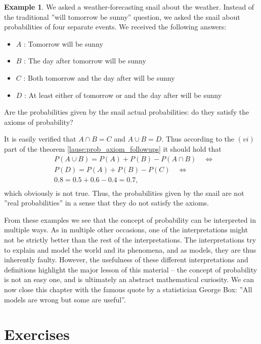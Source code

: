 \documentclass[12pt,a4paper,leqno]{report}
\theoremstyle{plain}
\theoremstyle{definition}
\newtheorem{esim}[equation]{Example}
\begin{document}
\begin{esim}
We asked a weather-forecasting snail about the weather. Instead of the traditional ''will tomorrow be sunny'' question, we asked the snail about probabilities of four separate events. We received the following answers:
\begin{itemize}
\item $A$ : Tomorrow will be sunny 
\item $B$ : The day after tomorrow will be sunny 
\item $C$ : Both tomorrow and the day after will be sunny 
\item $D$ : At least either of tomorrow or and the day after will be sunny 
\end{itemize}

Are the probabilities given by the snail actual probabilities: do they satisfy the axioms of probability?

It is easily verified that $A \cap B = C$ and $A \cup B = D$. Thus according to the $(vi)$ part of the theorem \ref{lause:prob_axiom_followups} it should hold that
\[
\begin{split}
&P(A \cup B) = P(A) + P(B) - P(A \cap B) \quad \Leftrightarrow \\
&P(D) = P(A) + P(B) - P(C) \quad \Leftrightarrow \\
&0.8 = 0.5 + 0.6 - 0.4 = 0.7, \\
\end{split}
\]
which obviously is not true. Thus, the probabilities given by the snail are not ''real probabilities'' in a sense that they do not satisfy the axioms.
\end{esim}

From these examples we see that the concept of probability can be interpreted in multiple ways. As in multiple other occasions, one of the interpretations might not be strictly better than the rest of the interpretations. The interpretations try to explain and model the world and its phenomena, and as models, they are thus inherently faulty. However, the usefulness of these different interpretations and definitions highlight the major lesson of this material -- the concept of probability is not an easy one, and is ultimately an abstract mathematical curiosity. We can now close this chapter with the famous quote by a statistician George Box: ''All models are wrong but some are useful''. 

\section{Exercises}
\end{document}
